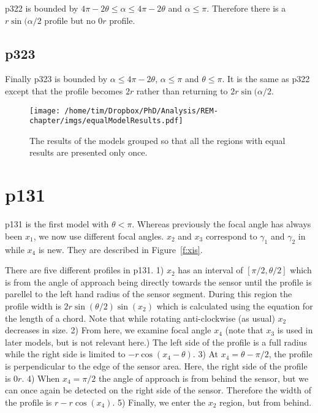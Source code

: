 p322 is bounded by $4\pi - 2\theta \le \alpha \le 4\pi - 2\theta$ and $\alpha \le \pi$. Therefore there is a $r\sin(\alpha/2$ profile but no $0r$ profile.



\subsection{p323} \label{p323}

Finally p323 is bounded by  $\alpha \le 4\pi - 2\theta $, $\alpha\le\pi$ and $\theta \le \pi$. It is the same as p322 except that the profile becomes $2r$ rather than returning to $2r\sin(\alpha/2$.




\begin{figure}[t]
\centering
\texttt{[image: /home/tim/Dropbox/PhD/Analysis/REM-chapter/imgs/equalModelResults.pdf]}
\caption[REM model solutions]{The results of the models grouped so that all the regions with equal results are presented only once.}
\label{f:equalModelResults}
\end{figure}

\section{p131} \label{p131}

p131 is the first model with $\theta < \pi$. Whereas previously the focal angle has always been $x_1$, we now use different focal angles. $x_2$ and $x_3$ correspond to $\gamma_1$ and $\gamma_2$ in \cite{rowcliffe2008estimating} while $x_4$ is new. They are described in Figure~\ref{f:xis}. 

There are five different profiles in p131. 1) $x_2$ has an interval of $[\pi/2, \theta/2]$ which is from the angle of approach being directly towards the sensor until the profile is parellel to the left hand radius of the sensor segment. During this region the profile width is $2r\sin\left(\theta/2\right)\sin(x_2)$ which is calculated using the equation for the length of a chord. Note that while rotating anti-clockwise (as usual) $x_2$ decreases in size. 2) From here, we examine focal angle $x_4$ (note that $x_3$ is used in later models, but is not relevant here.)  The left side of the profile is a full radius while the right side is limited to $- r\cos(x_4 - \theta)$. 3) At $x_4 =  \theta - \pi/2$, the profile is perpendicular to the edge of the sensor area. Here, the right side of the profile is $0r$. 4) When $x_4 = \pi/2$ the angle of approach is from behind the sensor, but we can once again be detected on the right side of the sensor. Therefore the width of the profile is $r - r\cos(x_4)$. 5) Finally, we enter the $x_2$ region, but from behind. 

